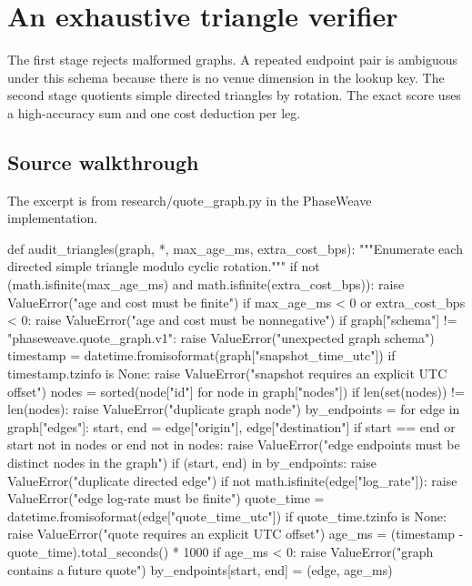 \documentclass[11pt,oneside,openany]{book}
\begin{document}
\chapter{An exhaustive triangle verifier}
The first stage rejects malformed graphs. A repeated endpoint pair is ambiguous under this schema because there is no venue dimension in the lookup key. The second stage quotients simple directed triangles by rotation. The exact score uses a high-accuracy sum and one cost deduction per leg.

\section*{Source walkthrough}
The excerpt is from research/quote\_graph.py in the PhaseWeave implementation.

\begin{BookCode}
def audit_triangles(graph, *, max_age_ms, extra_cost_bps):
    """Enumerate each directed simple triangle modulo cyclic rotation."""
    if not (math.isfinite(max_age_ms) and math.isfinite(extra_cost_bps)):
        raise ValueError("age and cost must be finite")
    if max_age_ms < 0 or extra_cost_bps < 0:
        raise ValueError("age and cost must be nonnegative")
    if graph["schema"] != "phaseweave.quote_graph.v1":
        raise ValueError("unexpected graph schema")
    timestamp = datetime.fromisoformat(graph["snapshot_time_utc"])
    if timestamp.tzinfo is None:
        raise ValueError("snapshot requires an explicit UTC offset")
    nodes = sorted(node["id"] for node in graph["nodes"])
    if len(set(nodes)) != len(nodes):
        raise ValueError("duplicate graph node")
    by_endpoints = {}
    for edge in graph["edges"]:
        start, end = edge["origin"], edge["destination"]
        if start == end or start not in nodes or end not in nodes:
            raise ValueError("edge endpoints must be distinct nodes in the graph")
        if (start, end) in by_endpoints:
            raise ValueError("duplicate directed edge")
        if not math.isfinite(edge["log_rate"]):
            raise ValueError("edge log-rate must be finite")
        quote_time = datetime.fromisoformat(edge["quote_time_utc"])
        if quote_time.tzinfo is None:
            raise ValueError("quote requires an explicit UTC offset")
        age_ms = (timestamp - quote_time).total_seconds() * 1000
        if age_ms < 0:
            raise ValueError("graph contains a future quote")
        by_endpoints[start, end] = (edge, age_ms)


\end{BookCode}
\end{document}
